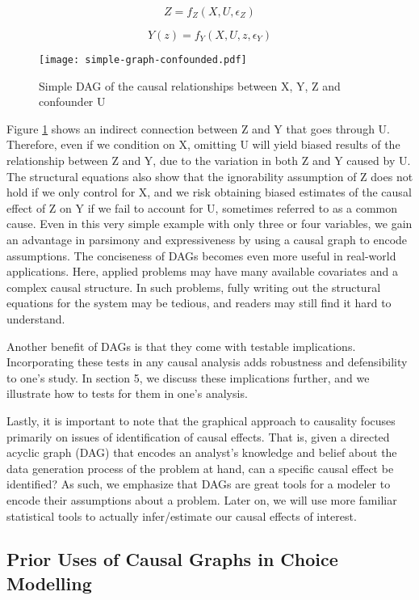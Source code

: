\[Z = f_Z(X, U, \epsilon_Z)  \]

\[Y(z) = f_Y(X, U, z, \epsilon_Y)  \]

\begin{figure}[h!]
   \centering
   \texttt{[image: simple-graph-confounded.pdf]}
   \caption{Simple DAG of the causal relationships between X, Y, Z and confounder U}
   \label{fig:simple-graph-confounded}
\end{figure}

Figure \ref{fig:simple-graph-confounded} shows an indirect connection between Z and Y that goes through U.
Therefore, even if we condition on X, omitting U will yield biased results of the relationship between Z and Y, due to the variation in both Z and Y caused by U.
The structural equations also show that the ignorability assumption of Z does not hold if we only control for X, and we risk obtaining biased estimates of the causal effect of Z on Y if we fail to account for U, sometimes referred to as a common cause.
Even in this very simple example with only three or four variables, we gain an advantage in parsimony and expressiveness by using a causal graph to encode assumptions.
The conciseness of DAGs becomes even more useful in real-world applications.
Here, applied problems may have many available covariates and a complex causal structure.
In such problems, fully writing out the structural equations for the system may be tedious, and readers may still find it hard to understand.

Another benefit of DAGs is that they come with testable implications.
Incorporating these tests in any causal analysis adds robustness and defensibility to one's study.
In section 5, we discuss these implications further, and we illustrate how to tests for them in one's analysis.

Lastly, it is important to note that the graphical approach to causality focuses
primarily on issues of identification of causal effects. That is, given a
directed acyclic graph (DAG) that encodes an analyst's knowledge and belief
about the data generation process of the problem at hand, can a specific
causal effect be identified?
As such, we emphasize that DAGs are great tools
for a modeler to encode their assumptions about a problem.
Later on, we will use more familiar statistical tools to actually infer/estimate our causal effects of interest.

\subsection{Prior Uses of Causal Graphs in Choice Modelling}
\label{sec:choice-graphs}

